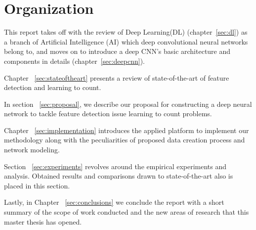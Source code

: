 \section{Organization}

This report takes off with the review of Deep Learning(DL) (chapter~\ref{sec:dl}) as a branch of Artificial Intelligence (AI) which deep convolutional neural networks belong to, and moves on to introduce a deep CNN's basic architecture and components in details (chapter~\ref{sec:deepcnn}). 

Chapter ~\ref{sec:stateoftheart} presents a review of state-of-the-art of feature detection and learning to count. 

In section ~\ref{sec:proposal}, we describe our proposal for constructing a deep neural network to tackle feature detection issue learning to count problems. 

Chapter ~\ref{sec:implementation} introduces the applied platform to implement our methodology  along with the peculiarities of proposed data creation process and network modeling. 

Section ~\ref{sec:experiments} revolves around the empirical experiments and analysis. Obtained results and comparisons drawn to state-of-the-art also is placed in this section.  

Lastly, in Chapter ~\ref{sec:conclusions} we conclude the report with a short summary of the scope of work conducted and the new areas of research that this master thesis has opened.